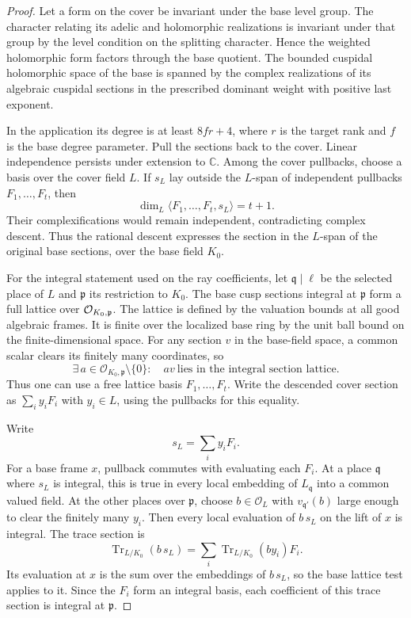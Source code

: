\begin{proof}
Let a form on the cover be invariant under the base level group.
The character relating its adelic and holomorphic realizations is invariant
under that group by the level condition on the splitting
character. Hence the weighted holomorphic form factors
through the base quotient. The bounded cuspidal holomorphic
space of the base is spanned by the complex realizations of its algebraic
cuspidal sections in the prescribed dominant weight with
positive last exponent.

In the application its degree is
at least \(8fr+4\), where \(r\) is the target rank and
\(f\) is the base degree parameter.
Pull the sections back to the cover. Linear independence persists under
extension to \(\mathbb C\). Among the cover pullbacks,
choose a basis over the cover field \(L\). If \(s_L\) lay outside the \(L\)-span of independent pullbacks \(F_1,\ldots,F_t\), then
\[
 \dim_L\langle F_1,\ldots,F_t,s_L\rangle=t+1.
\]
Their complexifications would remain independent, contradicting complex descent. Thus the rational
descent expresses the section in the \(L\)-span of the
original base sections, over the base field \(K_0\).

For the integral statement used on the ray coefficients,
let \(\mathfrak q\mid\ell\) be the selected place of \(L\)
and \(\mathfrak p\) its restriction to \(K_0\).
The base cusp sections integral at \(\mathfrak p\) form a
full lattice over \({\cal O}_{K_0,\mathfrak p}\). The
lattice is defined by the valuation bounds at all good
algebraic frames. It is finite over the localized base ring
by the unit ball bound on the finite-dimensional space.
For any section \(v\) in the base-field space, a common scalar clears its finitely many coordinates, so
\[
 \exists\,a\in\mathcal O_{K_0,\mathfrak p}\setminus\{0\}:\quad av\ \text{lies in the integral section lattice}.
\]
Thus one can use a
free lattice basis \(F_1,\ldots,F_t\). Write the descended
cover section as \(\sum_i y_i F_i\) with \(y_i\in L\),
using the pullbacks for this equality.

Write
\[
 s_L=\sum_i y_iF_i.
\]
For a base frame \(x\),
pullback commutes with evaluating each \(F_i\). At a place
\(\mathfrak q\) where \(s_L\) is integral, this is true
in every local embedding of \(L_\mathfrak q\) into a common
valued field. At the other places over \(\mathfrak p\), choose
\(b\in\mathcal O_L\) with \(v_{\mathfrak q'}(b)\) large
enough to clear the finitely many \(y_i\). Then every local
evaluation of \(b\,s_L\) on the lift of \(x\) is integral.
The trace section is
\[
    \operatorname{Tr}_{L/K_0}(b\,s_L)
       =\sum_i\operatorname{Tr}_{L/K_0}(by_i)F_i .
\]
Its evaluation at \(x\) is the sum over the embeddings
of \(b\,s_L\), so the base lattice test applies to it.
Since the \(F_i\) form an integral basis, each coefficient
of this trace section is integral at \(\mathfrak p\).


\end{proof}
